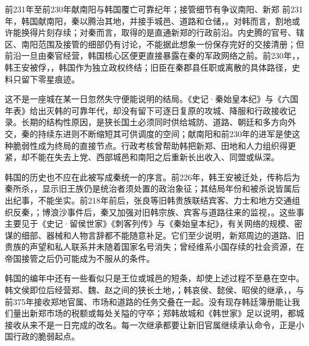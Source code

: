 \begin{event}{前231年至前230年}{献南阳与韩国覆亡}{可靠纪年；接管细节有争议}{南阳、新郑}
前231年，韩国献南阳，秦以腾治其地，并接手城邑、道路和仓储，。对韩而言，割地或许能换得片刻存续；对秦而言，取得的是直通新郑的行政前沿。内史腾的官号、辖区、南阳范围及接管的细部仍有讨论，不能据此想象一份保存完好的交接清册；但前沿一旦由秦官经营，韩国核心区便更直接暴露在秦的军政网络之前。前230年，，韩王安被俘，，韩国作为独立政权终结；旧臣在秦郡县任职或离散的具体路径，史料只留下零星痕迹。
\end{event}

这不是一座城在某一日忽然失守便能说明的结局。《史记·秦始皇本纪》与《六国年表》给出灭韩的可靠年代，却没有留下可逐日复原的攻城、降服和行政接收记录。长期的结构性原因，是狭长国土必须同时供给城防、道路、朝廷和多方向外交，秦的持续东进则不断缩短其可供调度的空间；献南阳和前230年的进军是使这种脆弱性成为终局的直接节点。行政考核曾帮助韩把新郑、田地和人力组织得更紧，却不能在失去上党、西部城邑和南阳之后重新长出收入、同盟或纵深。

韩国的历史也不应在此被写成秦统一的序言。前226年，韩王安被迁处，传称后为秦所杀，，显示旧王族仍是统治者须处置的政治象征；其结局年份和被杀说皆属后出纪事，不能坐实。前218年前后，张良等旧韩贵族联结宾客、力士和地方交通组织反秦，；博浪沙事件后，秦又加强对旧韩宗族、宾客与道路往来的监视，。这些事主要见于《史记·留侯世家》《刺客列传》与《秦始皇本纪》，有关网络的规模、密谋的细部、器械和人物言辞都不能随意补足。它们至少说明，新郑周边的道路、旧贵族的声望和私人联系并未随着国家名号消失；曾经维系小国存续的社会资源，在帝国接管之后仍可能成为不服从的条件。

韩国的编年中还有一些看似只是王位或城邑的短条，却使上述过程不至悬在空中。韩文侯即位后经营郑、魏、赵之间的狭长土地，；韩哀侯、懿侯、昭侯的继承，，与前375年接收郑地官属、市场和道路的任务交叠在一起。没有现存韩廷簿册能让我们量出新郑市场的税额或每处关隘的守卒；郑韩故城和《韩世家》足以说明，都城接收从来不是一日完成的改名。每一次继承都要让新旧官属继续承认命令，正是小国行政的脆弱起点。

